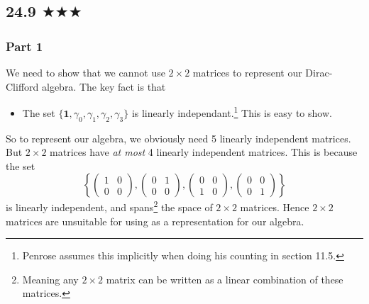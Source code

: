 
\subsection{24.9 $\bigstar \bigstar\bigstar$}
\subsubsection*{Part 1}
We need to show that we cannot use $2\times 2$ matrices to represent our Dirac-Clifford algebra. The key fact is that 
\begin{itemize}
\item The set $\{\mathbf{1},\gamma_0,\gamma_1,\gamma_2,\gamma_3\}$ is linearly independant.\footnote{Penrose assumes this implicitly when doing his counting in section 11.5.} This is easy to show.
\end{itemize}
So to represent our algebra, we obviously need 5 linearly independent matrices. But $2\times 2$ matrices have \emph{at most} 4 linearly independent matrices. This is because the set
$$\left\{
\begin{pmatrix} 
1&0 \\
0&0
\end{pmatrix},\begin{pmatrix} 
0&1 \\
0&0
\end{pmatrix},\begin{pmatrix} 
0&0 \\
1&0
\end{pmatrix},\begin{pmatrix} 
0&0 \\
0&1
\end{pmatrix}\right\}$$
is linearly independent, and spans\footnote{Meaning any $2\times 2$ matrix can be written as a linear combination of these matrices. } the space of $2\times 2$ matrices. Hence $2\times 2$ matrices are unsuitable for using as a representation for our algebra.

